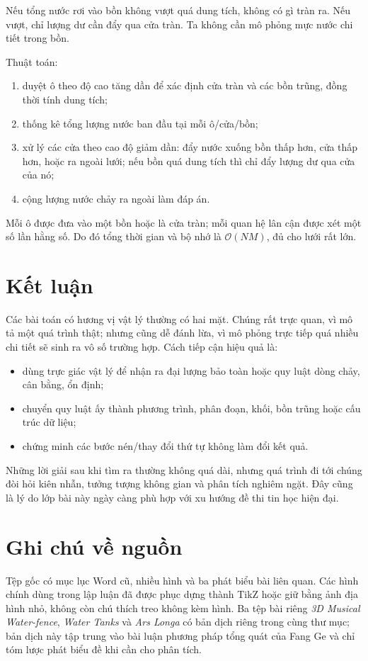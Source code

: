 \documentclass[11pt]{article}
\newcommand{\Oh}{\mathcal{O}}
\begin{document}
Nếu tổng nước rơi vào bồn không vượt quá dung tích, không có gì tràn ra. Nếu
vượt, chỉ lượng dư cần đẩy qua cửa tràn. Ta không cần mô phỏng mực nước chi
tiết trong bồn.

Thuật toán:
\begin{enumerate}
  \item duyệt ô theo độ cao tăng dần để xác định cửa tràn và các bồn trũng,
  đồng thời tính dung tích;
  \item thống kê tổng lượng nước ban đầu tại mỗi ô/cửa/bồn;
  \item xử lý các cửa theo cao độ giảm dần: đẩy nước xuống bồn thấp hơn, cửa
  thấp hơn, hoặc ra ngoài lưới; nếu bồn quá dung tích thì chỉ đẩy lượng dư qua
  cửa của nó;
  \item cộng lượng nước chảy ra ngoài làm đáp án.
\end{enumerate}

Mỗi ô được đưa vào một bồn hoặc là cửa tràn; mỗi quan hệ lân cận được xét một
số lần hằng số. Do đó tổng thời gian và bộ nhớ là \(\Oh(NM)\), đủ cho lưới rất
lớn.

\section{Kết luận}

Các bài toán có hương vị vật lý thường có hai mặt. Chúng rất trực quan, vì mô
tả một quá trình thật; nhưng cũng dễ đánh lừa, vì mô phỏng trực tiếp quá nhiều
chi tiết sẽ sinh ra vô số trường hợp. Cách tiếp cận hiệu quả là:
\begin{itemize}
  \item dùng trực giác vật lý để nhận ra đại lượng bảo toàn hoặc quy luật dòng
  chảy, cân bằng, ổn định;
  \item chuyển quy luật ấy thành phương trình, phân đoạn, khối, bồn trũng hoặc
  cấu trúc dữ liệu;
  \item chứng minh các bước nén/thay đổi thứ tự không làm đổi kết quả.
\end{itemize}

Những lời giải sau khi tìm ra thường không quá dài, nhưng quá trình đi tới
chúng đòi hỏi kiên nhẫn, tưởng tượng không gian và phân tích nghiêm ngặt. Đây
cũng là lý do lớp bài này ngày càng phù hợp với xu hướng đề thi tin học hiện
đại.

\section*{Ghi chú về nguồn}

Tệp gốc có mục lục Word cũ, nhiều hình và ba phát biểu bài liên quan. Các hình
chính dùng trong lập luận đã được phục dựng thành TikZ hoặc giữ bằng ảnh địa
hình nhỏ, không còn chú thích treo không kèm hình. Ba tệp bài riêng
\textit{3D Musical Water-fence}, \textit{Water Tanks} và \textit{Ars Longa}
có bản dịch riêng trong cùng thư mục; bản dịch này tập trung vào bài luận
phương pháp tổng quát của Fang Ge và chỉ tóm lược phát biểu đề khi cần cho
phân tích.
\end{document}
